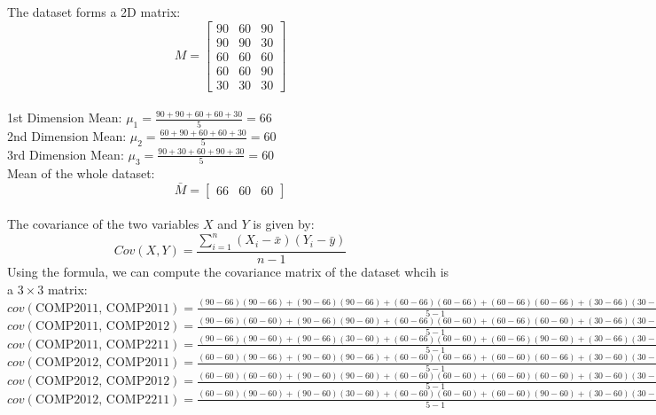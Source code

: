 \documentclass{book}
\begin{document}
The dataset forms a 2D matrix:
\[
    M = \begin{bmatrix}
        90 & 60 & 90\\
        90 & 90 & 30\\
        60 & 60 & 60\\
        60 & 60 & 90\\
        30 & 30 & 30
    \end{bmatrix}
\]
\\
1st Dimension Mean: \(\mu_1 = \frac{90 + 90 + 60 + 60 + 30}{5} = 66\)\\
\vspace{1mm}
2nd Dimension Mean: \(\mu_2 = \frac{60 + 90 + 60 + 60 + 30}{5} = 60\)\\
\vspace{1mm}
3rd Dimension Mean: \(\mu_3 = \frac{90 + 30 + 60 + 90 + 30}{5} = 60\)\\
\vspace{2mm}
Mean of the whole dataset:
\[
    \bar{M} = \begin{bmatrix}
        66 & 60 & 60
    \end{bmatrix}
\]
\\
The covariance of the two variables \(X\) and \(Y\) is given by:
\[
    Cov(X, Y) = \frac{\sum_{i=1}^{n} (X_i - \bar{x})(Y_i - \bar{y})}{n-1}
\]
Using the formula, we can compute the covariance matrix of the dataset whcih is a \(3 \times 3\) matrix:\\
\vspace{2mm}
\( cov(\text{COMP2011, COMP2011}) = \frac{(90-66)(90-66) + (90-66)(90-66) + (60-66)(60-66) + (60-66)(60-66) + (30-66)(30-66)}{5-1} = 630 \)\\
\( cov(\text{COMP2011, COMP2012}) = \frac{(90-66)(60-60) + (90-66)(90-60) + (60-66)(60-60) + (60-66)(60-60) + (30-66)(30-60)}{5-1} = 450 \)\\
\( cov(\text{COMP2011, COMP2211}) = \frac{(90-66)(90-60) + (90-66)(30-60) + (60-66)(60-60) + (60-66)(90-60) + (30-66)(30-60)}{5-1} = 225 \)\\
\( cov(\text{COMP2012, COMP2011}) = \frac{(60-60)(90-66) + (90-60)(90-66) + (60-60)(60-66) + (60-60)(60-66) + (30-60)(30-66)}{5-1} = 450 \)\\
\( cov(\text{COMP2012, COMP2012}) = \frac{(60-60)(60-60) + (90-60)(90-60) + (60-60)(60-60) + (60-60)(60-60) + (30-60)(30-60)}{5-1} = 450 \)\\
\( cov(\text{COMP2012, COMP2211}) = \frac{(60-60)(90-60) + (90-60)(30-60) + (60-60)(60-60) + (60-60)(90-60) + (30-60)(30-60)}{5-1} = 0 \)\\
\end{document}
